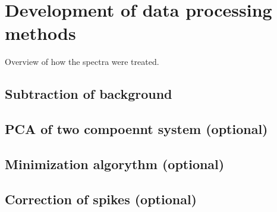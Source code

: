 \section{Development of data processing methods}

Overview of how the spectra were treated.


\subsection{Subtraction of background}
\subsection{PCA of two compoennt system (optional)}
\subsection{Minimization algorythm (optional)}
\subsection{Correction of spikes (optional)}




